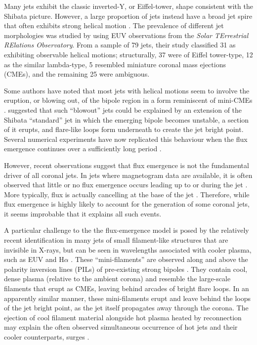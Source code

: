 \documentclass[twocolumn]{aastex6}
\begin{document}
Many jets exhibit the classic inverted-Y, or Eiffel-tower, shape consistent with the Shibata picture. However, a large proportion of jets instead have a broad jet spire that often exhibits strong helical motion \citep[e.g.][]{Patsourakos2008,Nistico2009,Shen2011,Hong2013,Moore2015}. {The prevalence of different jet morphologies was studied by \citet{Nistico2009} using EUV observations from the {\it Solar TErrestrial RElations Observatory}. From a sample of 79 jets, their study classified 31 as exhibiting observable helical motions; structurally, 37 were of Eiffel tower-type, 12 as the similar lambda-type, 5 resembled miniature coronal mass ejections (CMEs), and the remaining 25 were ambiguous.}

{Some authors have noted that most jets with helical motions seem to involve the eruption, or blowing out, of the bipole region in a form reminiscent of mini-CMEs} \citep{Nistico2009,Innes2009,Innes2010,Moore2010,Raouafi2010}. \citet{Moore2010} suggested that such ``blowout'' jets could be explained by an extension of the Shibata ``standard'' jet in which the emerging bipole becomes unstable, a section of it erupts, and flare-like loops form underneath to create the jet bright point. Several numerical experiments have now replicated this behaviour when the flux emergence continues over a sufficiently long period \citep[e.g.][]{Archontis2013,Moreno-Insertis2013,Fang2014}. 

However, recent observations suggest that flux emergence is not the fundamental driver of all coronal jets. In jets where magnetogram data are available, {it is often observed that little or no flux emergence occurs leading up to or during the jet} \citep[e.g.][]{Chandrashekhar2014,Hong2016}. More typically, flux is actually cancelling at the base of the jet \citep[e.g.][]{Chae1999,Liu2011,Hong2011,Young2014a,Young2014b,Adams2014,Panesar2016}. Therefore, while flux emergence is highly likely to account for {the generation of} some coronal jets, it seems improbable that it explains all such events. 

A particular challenge to the the flux-emergence model is posed by the relatively recent identification in many jets of small filament-like structures that are invisible in X-rays, but can be seen in wavelengths associated with cooler plasma, such as EUV and $\text{H}\alpha$ \citep[e.g.][]{Zheng2012,Sterling2015,Hong2016,Zhang2016b}. These ``mini-filaments'' are observed along and above the polarity inversion lines (PILs) of pre-existing strong bipoles \citep[e.g.][]{Chae1999,Hong2011,Hong2014,Hong2016,Zheng2012,Adams2014,Panesar2016,Zhang2016b}. They contain cool, dense plasma (relative to the ambient corona) and resemble the large-scale filaments that erupt as CMEs, leaving behind arcades of bright flare loops. In an apparently similar manner, these mini-filaments erupt and leave behind the loops of the jet bright point, as the jet itself propagates away through the corona. The ejection of cool filament material alongside hot plasma heated by reconnection may explain the often observed simultaneous occurrence of hot jets and their cooler counterparts, surges \citep[e.g.][]{Canfield1996}. 
\end{document}

